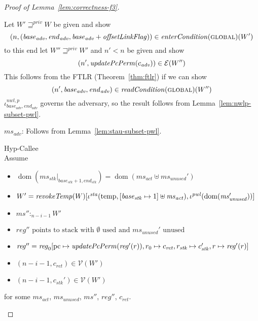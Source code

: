 \documentclass[a4paper]{article}
\DeclareMathOperator{\dom}{dom}
\newcommand{\var}[1]{\mathit{#1}}
\newcommand{\hs}{\var{ms}}
\newcommand{\ms}{\hs}
\newcommand{\pcreg}{\mathrm{pc}}
\newcommand{\start}{\var{base}}
\newcommand{\addrend}{\var{end}}
\newcommand{\reg}{\var{reg}}
\newcommand{\heap}{\var{mem}}
\newcommand{\adv}{\var{adv}}
\newcommand{\stk}{\var{stk}}
\newcommand{\nwl}{\var{nwl}}
\newcommand{\pwl}{\var{pwl}}
\newcommand{\sta}{\var{sta}}
\newcommand{\olf}{\var{offsetLinkFlag}}
\newcommand{\plainfun}[2]{
  \ifthenelse{\equal{#2}{}}
  {\mathit{#1}}
  {\mathit{#1}(#2)}
}
\newcommand{\updatePcPerm}[1]{\plainfun{updatePcPerm}{#1}}
\newcommand{\readCond}[1]{\plainfun{readCondition}{#1}}
\newcommand{\entryCond}[1]{\plainfun{enterCondition}{#1}}
\newcommand{\revokeTemp}[1]{\plainfun{revokeTemp}{#1}}
\newcommand{\futurestr}{\mathbin{\sqsupseteq}^{\var{priv}}}
\newcommand{\heapSat}[3][\heap]{#1 :_{#2} #3}
\newcommand{\memSat}[3][n]{\heapSat[#2]{#1}{#3}}
\newcommand{\asmType}{\plaindom{AsmType}}
\newcommand{\plaindom}[1]{\mathrm{#1}}
\newcommand{\intr}[2]{\mathcal{#1}}
\newcommand{\valueintr}[1]{\intr{V}{#1}}
\newcommand{\exprintr}[1]{\intr{E}{#1}}
\newcommand{\stdvr}{\valueintr{\asmType}}
\newcommand{\stder}{\exprintr{\asmType}}
\newcommand{\npair}[2][n]{\left(#1,#2 \right)}
\newcommand{\plainperm}[1]{\textsc{#1}}
\newcommand{\glob}{\plainperm{global}}
\newcommand{\plainview}[1]{\mathrm{#1}}
\newcommand{\temp}{\plainview{temp}}
\begin{document}
\begin{proof}[Proof of Lemma~\ref{lem:correctness-f3}]
\begin{enumproof}
\begin{enumproof}
\begin{enumproof}
            Let $W' \futurestr W$ be given and show
            \[
              \npair{(\start_\adv,\addrend_\adv,\start_\adv+\olf)} \in \entryCond{}(\glob)(W')
            \]
            to this end let $W'' \futurestr W'$ and $n' < n$ be given and show
            \[
              \npair[n']{\updatePcPerm{c_\adv}} \in \stder(W'')
            \]
            This follows from the FTLR (Theorem~\ref{thm:ftlr}) if we can show
            \[
              \npair[n']{\start_\adv,\addrend_\adv} \in \readCond{}(\glob)(W'')
            \]
            $\iota^{\nwl,p}_{\start_\adv,\addrend_\adv}$ governs the adversary, so the result follows from Lemma~\ref{lem:nwlp-subset-pwl}.
          \end{enumproof}
      \item $\ms_\adv$:
        Follows from Lemma~\ref{lem:stau-subset-pwl}.
    \end{enumproof}
  \item Hyp-Callee \\
    Assume
    \begin{itemize}
    \item $\dom(\ms_\stk |_{\start_\stk+1,\addrend_\stk}) = \dom(\ms_{\mathit{act}} \uplus \ms_{\mathit{unused}}')$
    \item $W' = \revokeTemp{W}[\iota^{\sta}(\temp,[\start_\stk \mapsto 1]\uplus\ms_{\mathit{act}}),\iota^{\pwl}(\dom(\ms_{\mathit{unused}}'))]$
    \item $\memSat[n-i-1]{\ms''}{W'}$
    \item $\reg'' \text{ points to stack with $\emptyset$ used and $\ms_{\mathit{unused}}'$ unused}$
    \item $\reg''= \reg_0[\pcreg\mapsto\updatePcPerm{\reg'(r)},r_0 \mapsto c_{\mathit{ret}}, r_\stk \mapsto c_\stk', r \mapsto \reg'(r)]$ 
    \item $\npair[n-i-1]{c_{\mathit{ret}}} \in \stdvr(W')$
    \item $\npair[n-i-1]{c_\stk'} \in \stdvr(W')$
    \end{itemize}
    for some $\ms_{\mathit{act}}$, $\ms_{\mathit{unused}}$, $\ms''$, $\reg''$, $c_{\mathit{ret}}$.
    

\end{enumproof}
\end{proof}
\end{document}

